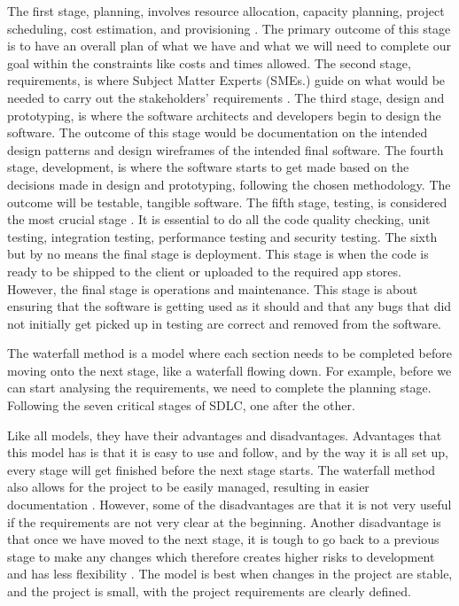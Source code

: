 The first stage, planning, involves resource allocation, capacity planning, project scheduling, cost estimation, and provisioning \cite{SDLC}. The primary outcome of this stage is to have an overall plan of what we have and what we will need to complete our goal within the constraints like costs and times allowed. The second stage, requirements, is where Subject Matter Experts (SMEs.) guide on what would be needed to carry out the stakeholders' requirements \cite{SDLC}. The third stage, design and prototyping, is where the software architects and developers begin to design the software. The outcome of this stage would be documentation on the intended design patterns and design wireframes of the intended final software. The fourth stage, development, is where the software starts to get made based on the decisions made in design and prototyping, following the chosen methodology. The outcome will be testable, tangible software. The fifth stage, testing, is considered the most crucial stage \cite{SDLC}. It is essential to do all the code quality checking, unit testing, integration testing, performance testing and security testing. The sixth but by no means the final stage is deployment. This stage is when the code is ready to be shipped to the client or uploaded to the required app stores. However, the final stage is operations and maintenance. This stage is about ensuring that the software is getting used as it should and that any bugs that did not initially get picked up in testing are correct and removed from the software. 

The waterfall method is a model where each section needs to be completed before moving onto the next stage, like a waterfall flowing down. For example, before we can start analysing the requirements, we need to complete the planning stage. Following the seven critical stages of SDLC, one after the other.

Like all models, they have their advantages and disadvantages. Advantages that this model has is that it is easy to use and follow, and by the way it is all set up, every stage will get finished before the next stage starts. The waterfall method also allows for the project to be easily managed, resulting in easier documentation \cite{cscm01slidesl5}. However, some of the disadvantages are that it is not very useful if the requirements are not very clear at the beginning. Another disadvantage is that once we have moved to the next stage, it is tough to go back to a previous stage to make any changes which therefore creates higher risks to development and has less flexibility \cite{cscm01slidesl5}. The model is best when changes in the project are stable, and the project is small, with the project requirements are clearly defined.

